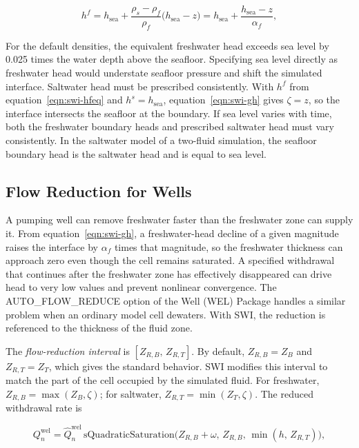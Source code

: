 \begin{equation}
\label{eqn:swi-hfeq}
h^{f}=h_{\mathrm{sea}}+\frac{\rho_{s}-\rho_{f}}{\rho_{f}}\big(h_{\mathrm{sea}}-z\big)
=h_{\mathrm{sea}}+\frac{h_{\mathrm{sea}}-z}{\alpha_{f}},
\end{equation}

\noindent For the default densities, the equivalent freshwater head exceeds sea level by 0.025 times the water depth above the seafloor. Specifying sea level directly as freshwater head would understate seafloor pressure and shift the simulated interface. Saltwater head must be prescribed consistently. With $h^{f}$ from equation~\ref{eqn:swi-hfeq} and $h^{s}=h_{\mathrm{sea}}$, equation~\ref{eqn:swi-gh} gives $\zeta=z$, so the interface intersects the seafloor at the boundary. If sea level varies with time, both the freshwater boundary heads and prescribed saltwater head must vary consistently. In the saltwater model of a two-fluid simulation, the seafloor boundary head is the saltwater head and is equal to sea level.

\subsection{Flow Reduction for Wells}
\label{sec:swi-afr}

A pumping well can remove freshwater faster than the freshwater zone can supply it. From equation~\ref{eqn:swi-gh}, a freshwater-head decline of a given magnitude raises the interface by $\alpha_{f}$ times that magnitude, so the freshwater thickness can approach zero even though the cell remains saturated. A specified withdrawal that continues after the freshwater zone has effectively disappeared can drive head to very low values and prevent nonlinear convergence. The AUTO\_FLOW\_REDUCE option of the Well (WEL) Package handles a similar problem when an ordinary model cell dewaters. With SWI, the reduction is referenced to the thickness of the fluid zone.

The \emph{flow-reduction interval} is $[Z_{R,B},\,Z_{R,T}]$. By default, $Z_{R,B}=Z_{B}$ and $Z_{R,T}=Z_{T}$, which gives the standard \mf behavior. SWI modifies this interval to match the part of the cell occupied by the simulated fluid. For freshwater, $Z_{R,B}=\max(Z_{B},\zeta)$; for saltwater, $Z_{R,T}=\min(Z_{T},\zeta)$. The reduced withdrawal rate is

\begin{equation}
\label{eqn:swi-afr}
Q_{n}^{\mathrm{wel}}=\hat Q_{n}^{\mathrm{wel}}\,
\mathrm{sQuadraticSaturation}\big(Z_{R,B}+\omega,\,Z_{R,B},\,\min(h,\,Z_{R,T})\big),
\end{equation}

